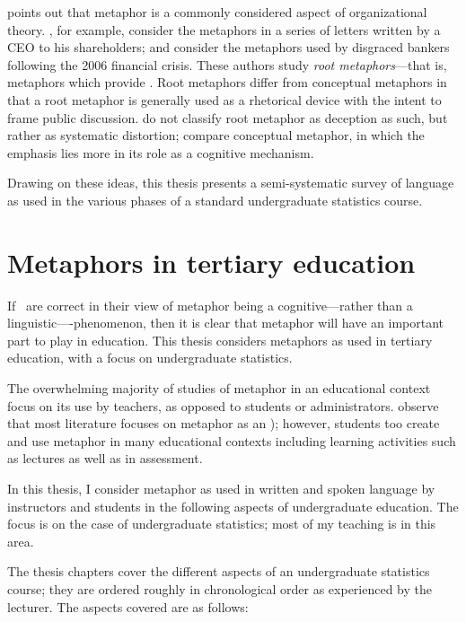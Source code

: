  points out that metaphor is a commonly
considered aspect of organizational theory.  , for
example, consider the metaphors in a series of letters written by a
CEO to his shareholders; and  consider the
metaphors used by disgraced bankers following the 2006 financial
crisis.  These authors study \emph{root metaphors}---that is,
metaphors which provide .  Root metaphors differ from
conceptual metaphors in that a root metaphor is generally used as a
rhetorical device with the intent to frame public discussion.
 do not classify root metaphor as deception as
such, but rather as systematic distortion; compare conceptual
metaphor, in which the emphasis lies more in its role as a cognitive
mechanism.

Drawing on these ideas, this thesis presents a semi-systematic survey
of language as used in the various phases of a standard undergraduate
statistics course.  

\section{Metaphors in tertiary education}


If~\citeauthor{lakoff1980} are correct in their view of metaphor being
a cognitive---rather than a linguistic----phenomenon, then it is clear
that metaphor will have an important part to play in education.  This
thesis considers metaphors as used in tertiary education, with a focus
on undergraduate statistics.

The overwhelming majority of studies of metaphor in an educational
context focus on its use by teachers, as opposed to students or
administrators.   observe that most literature
focuses on metaphor as an ); however, students too create and use metaphor in many
educational contexts including learning activities such as lectures as
well as in assessment.

In this thesis, I consider metaphor as used in written and spoken
language by instructors and students in the following aspects of
undergraduate education.  The focus is on the case of undergraduate
statistics; most of my teaching is in this area.

The thesis chapters cover the different aspects of an undergraduate
statistics course; they are ordered roughly in chronological order as
experienced by the lecturer.  The aspects covered are as follows:


